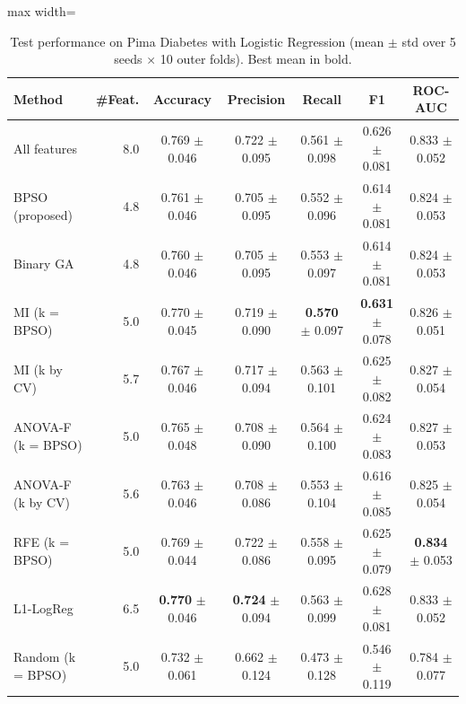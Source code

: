 \begin{table}[!t]
\centering
\caption{Test performance on Pima Diabetes with Logistic Regression (mean $\pm$ std over 5 seeds $\times$ 10 outer folds). Best mean in bold.}
\label{tab:results_pima_diabetes}
\footnotesize
\setlength{\tabcolsep}{4pt}
\begin{adjustbox}{max width=\linewidth}
\begin{tabular}{lrccccc}
\toprule
\textbf{Method} & \textbf{\#Feat.} & \textbf{Accuracy} & \textbf{Precision} & \textbf{Recall} & \textbf{F1} & \textbf{ROC-AUC} \\
\midrule
All features & 8.0 & 0.769 $\pm$ 0.046 & 0.722 $\pm$ 0.095 & 0.561 $\pm$ 0.098 & 0.626 $\pm$ 0.081 & 0.833 $\pm$ 0.052 \\
BPSO (proposed) & 4.8 & 0.761 $\pm$ 0.046 & 0.705 $\pm$ 0.095 & 0.552 $\pm$ 0.096 & 0.614 $\pm$ 0.081 & 0.824 $\pm$ 0.053 \\
Binary GA & 4.8 & 0.760 $\pm$ 0.046 & 0.705 $\pm$ 0.095 & 0.553 $\pm$ 0.097 & 0.614 $\pm$ 0.081 & 0.824 $\pm$ 0.053 \\
MI (k = BPSO) & 5.0 & 0.770 $\pm$ 0.045 & 0.719 $\pm$ 0.090 & \textbf{0.570} $\pm$ 0.097 & \textbf{0.631} $\pm$ 0.078 & 0.826 $\pm$ 0.051 \\
MI (k by CV) & 5.7 & 0.767 $\pm$ 0.046 & 0.717 $\pm$ 0.094 & 0.563 $\pm$ 0.101 & 0.625 $\pm$ 0.082 & 0.827 $\pm$ 0.054 \\
ANOVA-F (k = BPSO) & 5.0 & 0.765 $\pm$ 0.048 & 0.708 $\pm$ 0.090 & 0.564 $\pm$ 0.100 & 0.624 $\pm$ 0.083 & 0.827 $\pm$ 0.053 \\
ANOVA-F (k by CV) & 5.6 & 0.763 $\pm$ 0.046 & 0.708 $\pm$ 0.086 & 0.553 $\pm$ 0.104 & 0.616 $\pm$ 0.085 & 0.825 $\pm$ 0.054 \\
RFE (k = BPSO) & 5.0 & 0.769 $\pm$ 0.044 & 0.722 $\pm$ 0.086 & 0.558 $\pm$ 0.095 & 0.625 $\pm$ 0.079 & \textbf{0.834} $\pm$ 0.053 \\
L1-LogReg & 6.5 & \textbf{0.770} $\pm$ 0.046 & \textbf{0.724} $\pm$ 0.094 & 0.563 $\pm$ 0.099 & 0.628 $\pm$ 0.081 & 0.833 $\pm$ 0.052 \\
Random (k = BPSO) & 5.0 & 0.732 $\pm$ 0.061 & 0.662 $\pm$ 0.124 & 0.473 $\pm$ 0.128 & 0.546 $\pm$ 0.119 & 0.784 $\pm$ 0.077 \\
\bottomrule
\end{tabular}
\end{adjustbox}
\end{table}
